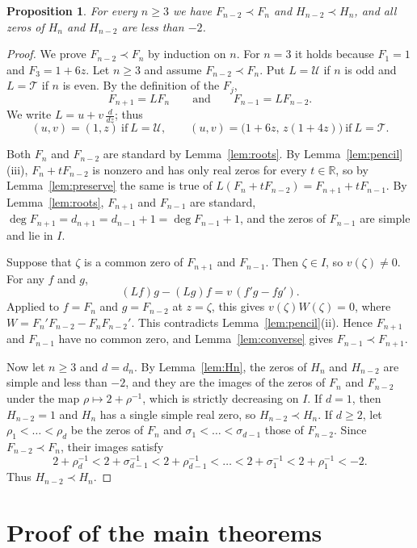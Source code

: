 \documentclass{amsart}
\newtheorem{proposition}[theorem]{Proposition}
\theoremstyle{remark}
\numberwithin{equation}{section}
\newcommand{\RR}{\mathbb{R}}
\newcommand{\cU}{\mathcal{U}}
\newcommand{\cT}{\mathcal{T}}
\begin{document}
\begin{proposition}\label{prop:interlace}
For every $n\ge 3$ we have $F_{n-2}\prec F_n$ and $H_{n-2}\prec H_n$, and all
zeros of $H_n$ and $H_{n-2}$ are less than $-2$.
\end{proposition}

\begin{proof}
We prove $F_{n-2}\prec F_n$ by induction on $n$. For $n=3$ it holds because
$F_1=1$ and $F_3=1+6z$. Let $n\ge 3$ and assume $F_{n-2}\prec F_n$. Put
$L=\cU$ if $n$ is odd and $L=\cT$ if $n$ is even. By the definition of the $F_j$,
\[
F_{n+1}=LF_n\qquad\text{and}\qquad F_{n-1}=LF_{n-2}.
\]
We write $L=u+v\,\frac{d}{dz}$; thus
\[
(u,v)=(1,z)\ \text{if}\ L=\cU,\qquad (u,v)=\bigl(1+6z,\,z(1+4z)\bigr)\ \text{if}\ L=\cT.
\]

Both $F_n$ and $F_{n-2}$ are standard by Lemma~\ref{lem:roots}. By
Lemma~\ref{lem:pencil}(iii), $F_n+tF_{n-2}$ is nonzero and has only real
zeros for every $t\in\RR$, so by Lemma~\ref{lem:preserve} the same is true of
$L(F_n+tF_{n-2})=F_{n+1}+tF_{n-1}$. By Lemma~\ref{lem:roots}, $F_{n+1}$ and
$F_{n-1}$ are standard, $\deg F_{n+1}=d_{n+1}=d_{n-1}+1=\deg F_{n-1}+1$, and
the zeros of $F_{n-1}$ are simple and lie in $I$.

Suppose that $\zeta$ is a common zero of $F_{n+1}$ and $F_{n-1}$. Then
$\zeta\in I$, so $v(\zeta)\ne 0$. For any $f$ and $g$,
\[
(Lf)g-(Lg)f=v\,(f'g-fg').
\]
Applied to $f=F_n$ and $g=F_{n-2}$ at $z=\zeta$, this gives
$v(\zeta)W(\zeta)=0$, where $W=F_n'F_{n-2}-F_nF_{n-2}'$. This contradicts
Lemma~\ref{lem:pencil}(ii). Hence $F_{n+1}$ and $F_{n-1}$ have no common zero,
and Lemma~\ref{lem:converse} gives $F_{n-1}\prec F_{n+1}$.

Now let $n\ge 3$ and $d=d_n$. By Lemma~\ref{lem:Hn}, the zeros of $H_n$ and
$H_{n-2}$ are simple and less than $-2$, and they are the images of the
zeros of $F_n$ and $F_{n-2}$ under the map $\rho\mapsto 2+\rho^{-1}$, which
is strictly decreasing on $I$. If $d=1$, then $H_{n-2}=1$ and $H_n$ has a
single simple real zero, so $H_{n-2}\prec H_n$. If $d\ge 2$, let
$\rho_1<\dots<\rho_d$ be the zeros of $F_n$ and $\sigma_1<\dots<\sigma_{d-1}$
those of $F_{n-2}$. Since $F_{n-2}\prec F_n$, their images satisfy
\[
2+\rho_d^{-1}<2+\sigma_{d-1}^{-1}<2+\rho_{d-1}^{-1}<\dots<2+\sigma_1^{-1}
<2+\rho_1^{-1}<-2.
\]
Thus $H_{n-2}\prec H_n$.
\end{proof}

\section{Proof of the main theorems}\label{sec:proof}
\end{document}
